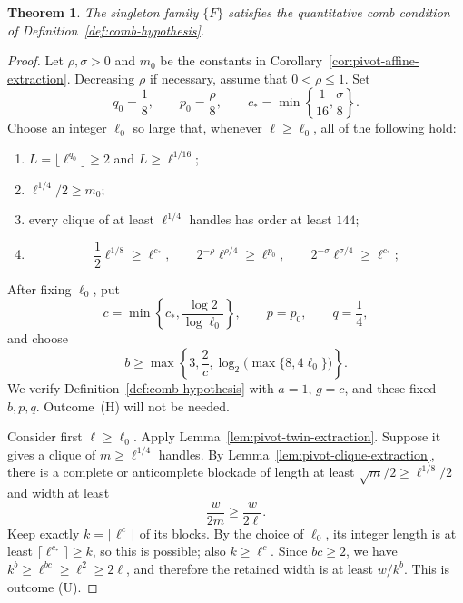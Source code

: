 \documentclass[10pt,a4paper]{amsart}
\newtheorem{theorem}{Theorem}
\begin{document}
\begin{theorem}
\label{thm:F-comb-conclusion}
The singleton family $\{F\}$ satisfies the quantitative comb condition of
Definition~\ref{def:comb-hypothesis}.
\end{theorem}

\begin{proof}
Let $\rho,\sigma>0$ and $m_0$ be the constants in
Corollary~\ref{cor:pivot-affine-extraction}.  Decreasing $\rho$ if
necessary, assume that $0<\rho\leq1$.  Set
\[
 q_0=\frac{1}{8},\qquad p_0=\frac{\rho}{8},\qquad
 c_*=\min\left\{\frac{1}{16},\frac{\sigma}{8}\right\}.
\]
Choose an integer $\ell_0$ so large that, whenever $\ell\geq\ell_0$,
all of the following hold:
\begin{enumerate}
 \item $L=\lfloor\ell^{q_0}\rfloor\geq2$ and
       $L\geq\ell^{1/16}$;
 \item $\ell^{1/4}/2\geq m_0$;
 \item every clique of at least $\ell^{1/4}$ handles has order at
       least $144$;
 \item
 \[
  \frac{1}{2}\ell^{1/8}\geq\ell^{c_*},\qquad
  2^{-\rho}\ell^{\rho/4}\geq\ell^{p_0},\qquad
  2^{-\sigma}\ell^{\sigma/4}\geq\ell^{c_*};
  \]
\end{enumerate}

After fixing $\ell_0$, put
\[
 c=\min\left\{c_*,\frac{\log 2}{\log\ell_0}\right\},
 \qquad p=p_0,\qquad q=\frac{1}{4},
\]
and choose
\begin{equation}
 b\geq\max\left\{3,\frac{2}{c},
          \log_2\bigl(\max\{8,4\ell_0\}\bigr)\right\}.
 \label{eq:comb-b-choice}
\end{equation}
We verify Definition~\ref{def:comb-hypothesis} with
$a=1$, $g=c$, and these fixed $b,p,q$.  Outcome~(H) will not be needed.

Consider first $\ell\geq\ell_0$.  Apply
Lemma~\ref{lem:pivot-twin-extraction}.  Suppose it gives a clique of
$m\geq\ell^{1/4}$ handles.  By
Lemma~\ref{lem:pivot-clique-extraction}, there is a complete or
anticomplete blockade of length at least
$\sqrt m/2\geq\ell^{1/8}/2$ and width at least
\[
                         \frac{w}{2m}\geq \frac{w}{2\ell}.
\]
Keep exactly $k=\lceil\ell^c\rceil$ of its blocks.  By the choice of
$\ell_0$, its integer length is at least
$\lceil\ell^{c_*}\rceil\geq k$, so this is possible; also
$k\geq\ell^c$.  Since
$b c\geq2$, we have $k^b\geq\ell^{bc}\geq\ell^2\geq2\ell$, and
therefore the retained width is at least $w/k^b$.  This is outcome (U).


\end{proof}
\end{document}
